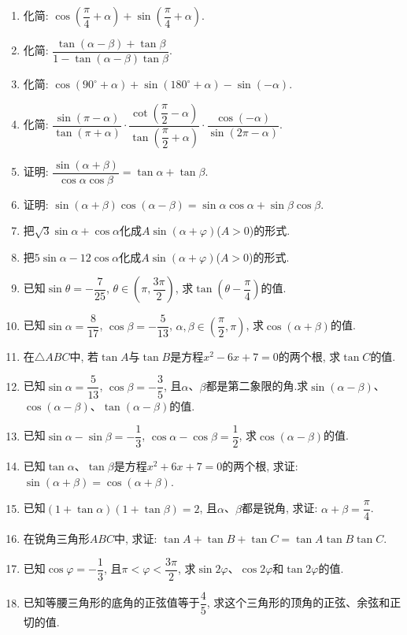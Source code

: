 \documentclass[10pt,a4paper]{article}
\begin{document}
\begin{enumerate}[1.]
\item 化简: $\cos (\dfrac{\pi}4+\alpha)+\sin (\dfrac{\pi}4+\alpha)$.
\item 化简: $\dfrac{\tan (\alpha -\beta)+\tan \beta}{1-\tan (\alpha -\beta)\tan \beta}$.
\item 化简: $\cos (90^\circ+\alpha)+\sin (180^\circ+\alpha)-\sin (-\alpha)$.
\item 化简: $\dfrac{\sin (\pi -\alpha)}{\tan (\pi +\alpha)}\cdot \dfrac{\cot (\dfrac{\pi}2-\alpha)}{\tan (\dfrac{\pi}2+\alpha)}\cdot \dfrac{\cos (-\alpha)}{\sin (2\pi -\alpha)}$.
\item 证明: $\dfrac{\sin (\alpha +\beta)}{\cos \alpha \cos \beta}=\tan \alpha +\tan \beta$.
\item 证明: $\sin (\alpha +\beta)\cos (\alpha -\beta)=\sin \alpha \cos \alpha +\sin \beta \cos \beta$.
\item 把$\sqrt 3\sin \alpha +\cos \alpha$化成$A\sin (\alpha +\varphi)$($A>0$)的形式.
\item 把$5\sin \alpha -12\cos \alpha$化成$A\sin (\alpha +\varphi)$($A>0$)的形式.
\item 已知$\sin \theta =-\dfrac 7{25}$, $\theta \in (\pi ,\dfrac{3\pi}2)$, 求$\tan (\theta -\dfrac{\pi}4)$的值.
\item 已知$\sin \alpha =\dfrac 8{17}$, $\cos \beta =-\dfrac 5{13}$, $\alpha,\beta \in (\dfrac{\pi}2,\pi)$, 求$\cos (\alpha +\beta)$的值.
\item 在$\triangle ABC$中, 若$\tan A$与$\tan B$是方程$x^2-6x+7=0$的两个根, 求$\tan C$的值.
\item 已知$\sin \alpha =\dfrac 5{13}$, $\cos \beta =-\dfrac 35$, 且$\alpha$、$\beta$都是第二象限的角.求$\sin (\alpha -\beta)$、$\cos (\alpha -\beta)$、$\tan (\alpha -\beta)$的值.
\item 已知$\sin \alpha -\sin \beta =-\dfrac 13$, $\cos \alpha -\cos \beta =\dfrac 12$, 求$\cos (\alpha -\beta)$的值.
\item 已知$\tan \alpha$、$\tan \beta$是方程$x^2+6x+7=0$的两个根, 求证: $\sin (\alpha +\beta)=\cos (\alpha +\beta)$.
\item 已知$(1+\tan \alpha)(1+\tan \beta)=2$, 且$\alpha$、$\beta$都是锐角, 求证: $\alpha +\beta =\dfrac{\pi}4$.
\item 在锐角三角形$ABC$中, 求证: $\tan A+\tan B+\tan C=\tan A\tan B\tan C$.
\item 已知$\cos \varphi =-\dfrac 13$, 且$\pi <\varphi <\dfrac{3\pi}2$, 求$\sin 2\varphi$、$\cos 2\varphi$和$\tan 2\varphi$的值.
\item 已知等腰三角形的底角的正弦值等于$\dfrac 45$, 求这个三角形的顶角的正弦、余弦和正切的值.

\end{enumerate}
\end{document}
